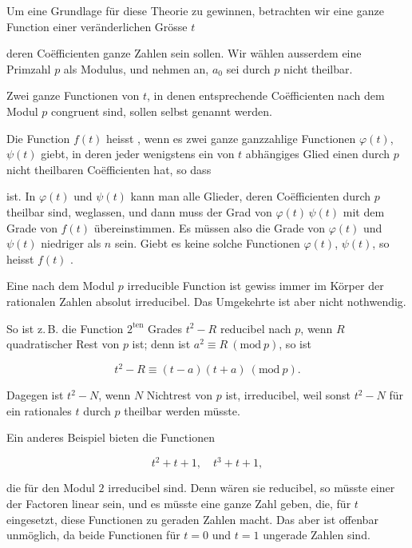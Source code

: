 Um eine Grundlage für diese Theorie zu gewinnen, betrachten wir eine ganze Function einer veränderlichen Grösse $t$


deren Co\"efficienten ganze Zahlen sein sollen. Wir wählen ausserdem eine Primzahl $p$ als Modulus, und nehmen an, $a_0$ sei durch $p$ nicht theilbar.

Zwei ganze Functionen von $t$, in denen entsprechende Co\"efficienten nach dem Modul $p$ congruent sind, sollen selbst  genannt werden.

Die Function $f(t)$ heisst , wenn es zwei ganze ganzzahlige Functionen $\varphi(t)$, $\psi(t)$ giebt, in deren jeder wenigstens ein von $t$ abhängiges Glied einen durch $p$ nicht theilbaren Co\"efficienten hat, so dass


ist. In $\varphi(t)$ und $\psi(t)$ kann man alle Glieder, deren Co\"efficienten durch $p$ theilbar sind, weglassen, und dann muss der Grad von $\varphi(t)\,\psi(t)$ mit dem Grade von $f(t)$ übereinstimmen. Es müssen also die Grade von $\varphi(t)$ und $\psi(t)$ niedriger als $n$ sein. Giebt es keine solche Functionen $\varphi(t)$, $\psi(t)$, so heisst $f(t)$ .

Eine nach dem Modul $p$ irreducible Function ist gewiss immer im Körper der rationalen Zahlen absolut irreducibel. Das Umgekehrte ist aber nicht nothwendig.

So ist z.\,B. die Function $2^{\mathrm{ten}}$ Grades $t^2 - R$ reducibel nach $p$, wenn $R$ quadratischer Rest von $p$ ist; denn ist $a^2 \equiv R\ (\mathrm{mod}\ p)$, so ist

\[
t^2 - R \equiv (t-a)(t+a)\ (\mathrm{mod}\ p).
\]

Dagegen ist $t^2 - N$, wenn $N$ Nichtrest von $p$ ist, irreducibel, weil sonst $t^2 - N$ für ein rationales $t$ durch $p$ theilbar werden müsste.

Ein anderes Beispiel bieten die Functionen

\[
t^2 + t + 1, \quad t^3 + t + 1,
\]

die für den Modul $2$ irreducibel sind. Denn wären sie reducibel, so müsste einer der Factoren linear sein, und es müsste eine ganze Zahl geben, die, für $t$ eingesetzt, diese Functionen zu geraden Zahlen macht. Das aber ist offenbar unmöglich, da beide Functionen für $t = 0$ und $t = 1$ ungerade Zahlen sind.
